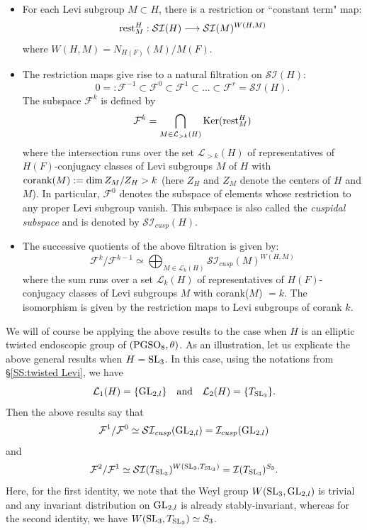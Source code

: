 \documentclass[11pt]{amsart}
\theoremstyle{plain}
\numberwithin{equation}{section}
\def\SL{{\rm SL}}
\def\PGSO{{\rm PGSO}}
\def\GL{{\rm GL}}
\begin{document}
\begin{itemize}
\item[(i)] For each Levi subgroup $M \subset H$, there is a  restriction or ``constant term" map:
\[  {\rm rest}_M^H:  \mathcal{SI}(H) \longrightarrow \mathcal{SI}(M)^{W(H,M)} \]
where $W(H,M) = N_{H(F)}(M)/ M(F)$. 

\vskip 5pt

\item[(ii)] The restriction maps give rise to a natural filtration on $\mathcal{SI}(H)$:
\[ 0  =: \mathcal{F}^{-1} \subset  \mathcal{F}^0  \subset \mathcal{F}^1 \subset ...\subset \mathcal{F}^r = \mathcal{SI}(H). \] 
The subspace $\mathcal{F}^k$ is defined by 
\[  \mathcal{F}^k =  \bigcap_{M \in \mathcal{L}_{>k}(H)}  {\rm Ker}({\rm rest}_M^H) \] 
where the intersection runs over the set $\mathcal{L}_{>k}(H)$ of representatives of $H(F)$-conjugacy classes of Levi subgroups $M$ of $H$   with ${\rm corank}(M) :=  \dim Z_M/ Z_H > k$ (here $Z_H$ and $Z_M$ denote the centers of $H$ and $M$).  
In particular, $\mathcal{F}^0$ denotes the subspace of elements whose restriction to any proper Levi subgroup vanish. 
This subspace is also called the {\it cuspidal subspace} and is denoted by $\mathcal{SI}_{cusp}(H)$. 
\vskip 5pt

\item[(iii)] The successive quotients of the above filtration is given by:
\[  \mathcal{F}^k / \mathcal{F}^{k-1} \simeq  \bigoplus_{M \in \mathcal{L}_k(H)}  \mathcal{SI}_{cusp}(M)^{W(H,M)} \]
where the sum runs over a set $\mathcal{L}_k(H)$ of representatives of $H(F)$-conjugacy classes of Levi subgroups $M$ with corank($M$) $=k$.  
The isomorphism is given by the restriction maps to Levi subgroups of corank $k$. 
\end{itemize}

\vskip 5pt

We will of course be applying the above results to the case when $H$ is an elliptic twisted endoscopic group of $(\PGSO_8, \theta)$.
As an illustration, let us explicate the above general results when  $H = \SL_3$. In this case, using the notations from \S \ref{SS:twisted Levi}, we have
\[   \mathcal{L}_1(H) =  \{ \GL_{2,l} \} \quad \text{and} \quad \mathcal{L}_2(H) = \{T_{\SL_3} \}. \]
Then the above results say that
\begin{equation} \label{E:Fil1}
 \mathcal{F}^1/\mathcal{F}^0 \simeq  \mathcal{SI}_{cusp}(\GL_{2,l})  = \mathcal{I}_{cusp}(\GL_{2,l}) \end{equation}
and
\begin{equation} \label{E:Fil2}
 \mathcal{F}^2/\mathcal{F}^1 \simeq \mathcal{SI}(T_{\SL_3})^{W(\SL_3, T_{\SL_3})} = \mathcal{I}(T_{\SL_3})^{S_3}. \end{equation}
 Here, for the first identity, we note that the Weyl group $W(\SL_3, \GL_{2,l})$ is trivial and any invariant distribution on $\GL_{2,l}$ is already stably-invariant, whereas for the second identity,  we have $W(\SL_3, T_{\SL_3}) \simeq S_3$. 
 \vskip 5pt
 
\end{document}
